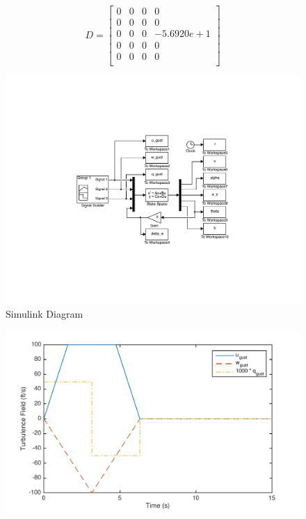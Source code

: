 \documentclass[12pt]{article}
\begin{document}
\begin{equation*}
D =
\begin{bmatrix}
           0 &         0 & 0 & 0 \\
           0 &         0 & 0 & 0 \\
           0 &         0 & 0 & -5.6920e+1 \\
           0 &         0 & 0 & 0 \\
           0 &         0 & 0 & 0 \\
\end{bmatrix}
\end{equation*}

\begin{figure}[h]
\begin{center}
\includegraphics[width=.9\textwidth]{figures/simulink}
\caption{Simulink Diagram}
\end{center}
\end{figure}

\begin{figure}[h]
\begin{center}
\includegraphics[width=.9\textwidth]{figures/gusts}
\end{center}
\end{figure}
\end{document}
